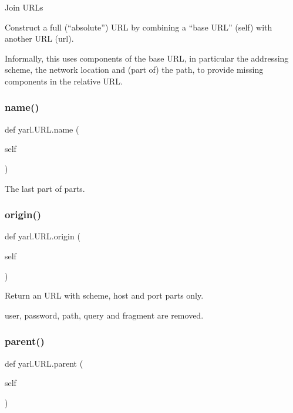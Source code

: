 \begin{DoxyVerb}Join URLs

Construct a full (“absolute”) URL by combining a “base URL”
(self) with another URL (url).

Informally, this uses components of the base URL, in
particular the addressing scheme, the network location and
(part of) the path, to provide missing components in the
relative URL.\end{DoxyVerb}
 \mbox{\label{classyarl_1_1_u_r_l_acb5d19be34f6fec67c92471c3f098f1a}} 
\subsubsection{\texorpdfstring{name()}{name()}}
{\footnotesize\ttfamily def yarl.\+U\+R\+L.\+name (\begin{DoxyParamCaption}\item[{}]{self }\end{DoxyParamCaption})}

\begin{DoxyVerb}The last part of parts.\end{DoxyVerb}
 \mbox{\label{classyarl_1_1_u_r_l_aca6dbae4d20f05154cd4b61d0c2bb2e0}} 
\subsubsection{\texorpdfstring{origin()}{origin()}}
{\footnotesize\ttfamily def yarl.\+U\+R\+L.\+origin (\begin{DoxyParamCaption}\item[{}]{self }\end{DoxyParamCaption})}

\begin{DoxyVerb}Return an URL with scheme, host and port parts only.

user, password, path, query and fragment are removed.\end{DoxyVerb}
 \mbox{\label{classyarl_1_1_u_r_l_a76a6b04d97a5ccab56a2b5a1d25bc0e7}} 
\subsubsection{\texorpdfstring{parent()}{parent()}}
{\footnotesize\ttfamily def yarl.\+U\+R\+L.\+parent (\begin{DoxyParamCaption}\item[{}]{self }\end{DoxyParamCaption})}


